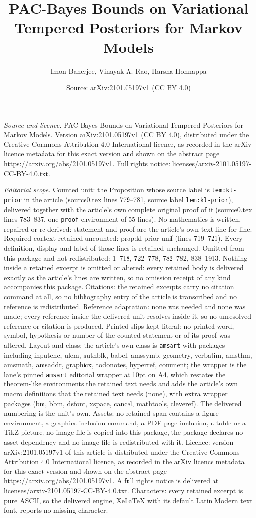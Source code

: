 \documentclass[10pt,a4paper]{amsart}
\title[PAC-Bayes Bounds on Variational Tempered Posteriors for Mark]{PAC-Bayes Bounds on Variational Tempered Posteriors for Markov Models}
\author{Imon Banerjee, Vinayak A. Rao, Harsha Honnappa}
\date{Source: arXiv:2101.05197v1 (CC BY 4.0)}
\begin{document}
\maketitle

\noindent\emph{Source and licence.} PAC-Bayes Bounds on Variational Tempered Posteriors for Markov Models. Version arXiv:2101.05197v1 (CC BY 4.0), distributed under the Creative Commons Attribution 4.0 International licence, as recorded in the arXiv licence metadata for this exact version and shown on the abstract page https://arxiv.org/abs/2101.05197v1. Full rights notice: licenses/arxiv-2101.05197-CC-BY-4.0.txt.\par\smallskip

\noindent\textit{Editorial scope.} Counted unit: the Proposition whose source label is \texttt{lem:kl-prior} in the article (source0.tex lines 779--781, source label \texttt{lem:kl-prior}), delivered together with the article's own complete original proof of it (source0.tex lines 783--837, one \texttt{proof} environment of 55 lines). No mathematics is written, repaired or re-derived: statement and proof are the article's own text line for line. Required context retained uncounted: prop:kl-prior-unif (lines 719--721). Every definition, display and label of those lines is retained unchanged. Omitted from this package and not redistributed: 1--718, 722--778, 782--782, 838--1913. Nothing inside a retained excerpt is omitted or altered: every retained body is delivered exactly as the article's lines are written, so no omission receipt of any kind accompanies this package. Citations: the retained excerpts carry no citation command at all, so no bibliography entry of the article is transcribed and no reference is redistributed. Reference adaptation: none was needed and none was made; every reference inside the delivered unit resolves inside it, so no unresolved reference or citation is produced. Printed slips kept literal: no printed word, symbol, hypothesis or number of the counted statement or of its proof was altered. Layout and class: the article's own class is \texttt{amsart} with packages including inputenc, ulem, authblk, babel, amssymb, geometry, verbatim, amsthm, amsmath, amsaddr, graphicx, todonotes, hyperref, comment; the wrapper is the lane's pinned \texttt{amsart} editorial wrapper at 10pt on A4, which restates the theorem-like environments the retained text needs and adds the article's own macro definitions that the retained text needs (none), with extra wrapper packages (bm, bbm, dsfont, xspace, cancel, mathtools, cleveref). The delivered numbering is the unit's own. Assets: no retained span contains a figure environment, a graphics-inclusion command, a PDF-page inclusion, a table or a TikZ picture; no image file is copied into this package, the package declares no asset dependency and no image file is redistributed with it. Licence: version arXiv:2101.05197v1 of this article is distributed under the Creative Commons Attribution 4.0 International licence, as recorded in the arXiv licence metadata for this exact version and shown on the abstract page https://arxiv.org/abs/2101.05197v1. A full rights notice is delivered at licenses/arxiv-2101.05197-CC-BY-4.0.txt. Characters: every retained excerpt is pure ASCII, so the delivered engine, XeLaTeX with its default Latin Modern text font, reports no missing character.
\end{document}
